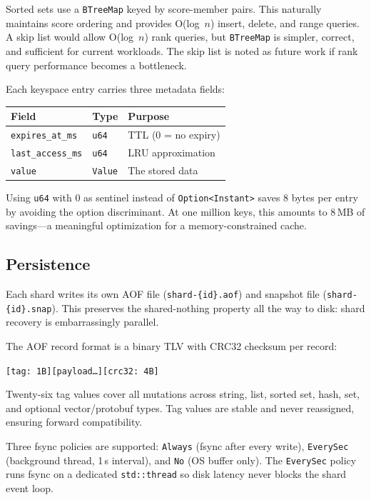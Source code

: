 \documentclass[conference]{IEEEtran}
\begin{document}
Sorted sets use a \texttt{BTreeMap} keyed by score-member pairs.
This naturally maintains score ordering and provides O(log~$n$)
insert, delete, and range queries. A skip list would allow O(log~$n$)
rank queries, but \texttt{BTreeMap} is simpler, correct, and
sufficient for current workloads. The skip list is noted as future
work if rank query performance becomes a bottleneck.

Each keyspace entry carries three metadata fields:

\smallskip
\begin{tabular}{@{}lll@{}}
\toprule
\textbf{Field} & \textbf{Type} & \textbf{Purpose} \\
\midrule
\texttt{expires\_at\_ms} & \texttt{u64} & TTL (0 = no expiry) \\
\texttt{last\_access\_ms} & \texttt{u64} & LRU approximation \\
\texttt{value} & \texttt{Value} & The stored data \\
\bottomrule
\end{tabular}
\smallskip

\noindent
Using \texttt{u64} with 0 as sentinel instead of
\texttt{Option<Instant>} saves 8 bytes per entry by avoiding the
option discriminant. At one million keys, this amounts to 8\,MB of
savings---a meaningful optimization for a memory-constrained cache.


\subsection{Persistence}

Each shard writes its own AOF file (\texttt{shard-\{id\}.aof}) and
snapshot file (\texttt{shard-\{id\}.snap}). This preserves the
shared-nothing property all the way to disk: shard recovery is
embarrassingly parallel.

The AOF record format is a binary TLV with CRC32 checksum per record:

\smallskip
\centerline{\texttt{[tag: 1B][payload\ldots][crc32: 4B]}}
\smallskip

\noindent
Twenty-six tag values cover all mutations across string, list, sorted
set, hash, set, and optional vector/protobuf types. Tag values are
stable and never reassigned, ensuring forward compatibility.

Three fsync policies are supported: \texttt{Always} (fsync after every
write), \texttt{EverySec} (background thread, 1\,s interval), and
\texttt{No} (OS buffer only). The \texttt{EverySec} policy runs
fsync on a dedicated \texttt{std::thread} so disk latency never blocks
the shard event loop.
\end{document}
